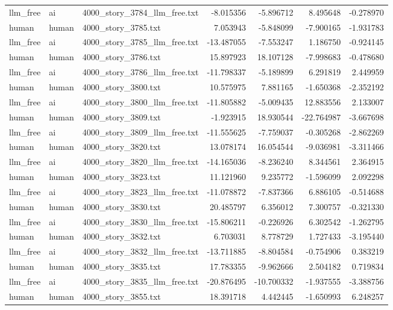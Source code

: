 \begin{longtable}{lllrrrr}
llm\_free & ai & 4000\_story\_3784\_llm\_free.txt & -8.015356 & -5.896712 & 8.495648 & -0.278970 \\
human & human & 4000\_story\_3785.txt & 7.053943 & -5.848099 & -7.900165 & -1.931783 \\
llm\_free & ai & 4000\_story\_3785\_llm\_free.txt & -13.487055 & -7.553247 & 1.186750 & -0.924145 \\
human & human & 4000\_story\_3786.txt & 15.897923 & 18.107128 & -7.998683 & -0.478680 \\
llm\_free & ai & 4000\_story\_3786\_llm\_free.txt & -11.798337 & -5.189899 & 6.291819 & 2.449959 \\
human & human & 4000\_story\_3800.txt & 10.575975 & 7.881165 & -1.650368 & -2.352192 \\
llm\_free & ai & 4000\_story\_3800\_llm\_free.txt & -11.805882 & -5.009435 & 12.883556 & 2.133007 \\
human & human & 4000\_story\_3809.txt & -1.923915 & 18.930544 & -22.764987 & -3.667698 \\
llm\_free & ai & 4000\_story\_3809\_llm\_free.txt & -11.555625 & -7.759037 & -0.305268 & -2.862269 \\
human & human & 4000\_story\_3820.txt & 13.078174 & 16.054544 & -9.036981 & -3.311466 \\
llm\_free & ai & 4000\_story\_3820\_llm\_free.txt & -14.165036 & -8.236240 & 8.344561 & 2.364915 \\
human & human & 4000\_story\_3823.txt & 11.121960 & 9.235772 & -1.596099 & 2.092298 \\
llm\_free & ai & 4000\_story\_3823\_llm\_free.txt & -11.078872 & -7.837366 & 6.886105 & -0.514688 \\
human & human & 4000\_story\_3830.txt & 20.485797 & 6.356012 & 7.300757 & -0.321330 \\
llm\_free & ai & 4000\_story\_3830\_llm\_free.txt & -15.806211 & -0.226926 & 6.302542 & -1.262795 \\
human & human & 4000\_story\_3832.txt & 6.703031 & 8.778729 & 1.727433 & -3.195440 \\
llm\_free & ai & 4000\_story\_3832\_llm\_free.txt & -13.711885 & -8.804584 & -0.754906 & 0.383219 \\
human & human & 4000\_story\_3835.txt & 17.783355 & -9.962666 & 2.504182 & 0.719834 \\
llm\_free & ai & 4000\_story\_3835\_llm\_free.txt & -20.876495 & -10.700332 & -1.937555 & -3.388756 \\
human & human & 4000\_story\_3855.txt & 18.391718 & 4.442445 & -1.650993 & 6.248257 \\

\end{longtable}
